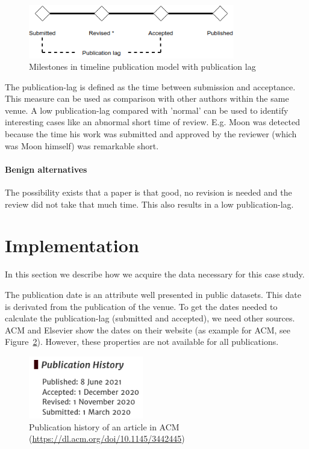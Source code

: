 \documentclass{ou-report}
\begin{document}
\begin{figure}[H]
\centering
\includegraphics[width=9cm]{images/timeline.drawio.png}
\caption{Milestones in timeline publication model with publication lag}
\label{fig:timeline}
\end{figure}

The publication-lag is defined as the time between submission and acceptance.
This measure can be used as comparison with other authors within the same venue.
A low publication-lag compared with 'normal' can be used to identify interesting
cases like an abnormal short time of review. E.g. Moon was detected because the
time his work was submitted and approved by the reviewer (which was Moon
himself) was remarkable short.
\paragraph{Benign alternatives}
The possibility exists that a paper is that good, no revision is needed and the 
review did not take that much time. This also results in a low publication-lag.

\section{Implementation}
In this section we describe how we acquire the data necessary for this case
study.

The publication date is an attribute well presented in public datasets. This 
date is derivated from the publication of the venue. 
To get the dates needed to calculate the publication-lag (submitted and
accepted), we need other sources. ACM and Elsevier show the dates on their
website (as example for ACM, see Figure~\ref{fig:acm_dates}). However, these
properties are not available for all publications.

\begin{figure}[H]
\centering
\includegraphics[width=5cm]{ACM_Digital_Threats_Research_and_Practice.png}
\caption{Publication history of an article in ACM (\url{https://dl.acm.org/doi/10.1145/3442445})}
\label{fig:acm_dates}
\end{figure}
\end{document}
